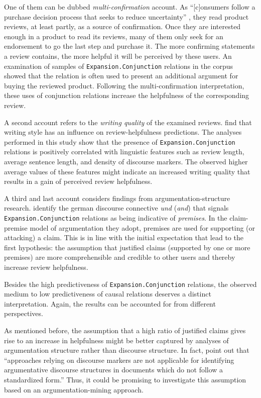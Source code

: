 \documentclass[
    a4paper,%
    12pt,%
    oneside,%
    toc=bibliography,
    final,
]{scrartcl}
\begin{document}
One of them can be dubbed \textit{multi-confirmation} account. As “[c]onsumers follow a purchase decision process that seeks to reduce uncertainty” \citep[187]{MudambiSchuff2010}, they read product reviews, at least partly, as a source of confirmation. Once they are interested enough in a product to read its reviews, many of them only seek for an endorsement to go the last step and purchase it. The more confirming statements a review contains, the more helpful it will be perceived by these users. An examination of samples of \lstinline|Expansion.Conjunction| relations in the corpus showed that the relation is often used to present an additional argument for buying the reviewed product. Following the multi-confirmation interpretation, these uses of conjunction relations increase the helpfulness of the corresponding review.

A second account refers to the \textit{writing quality} of the examined reviews. \citet{Liu2008} find that writing style has an influence on review-helpfulness predictions. The analyses performed in this study show that the presence of \lstinline|Expansion.Conjunction| relations is positively correlated with linguistic features such as review length, average sentence length, and density of discourse markers. The observed higher average values of these features might indicate an increased writing quality that results in a gain of perceived review helpfulness.

A third and last account considers findings from argumentation-structure research. \citet[2239]{Eckle-Kohler2015} identify the german discourse connective \textit{und} (\textit{and}) that signals \lstinline|Expansion.Conjunction| relations as being indicative of \textit{premises}. In the claim-premise model of argumentation they adopt, premises are used for supporting (or attacking) a claim. This is in line with the initial expectation that lead to the first hypothesis: the assumption that justified claims (supported by one or more premises) are more comprehensible and credible to other users and thereby increase review helpfulness.


Besides the high predictiveness of \lstinline|Expansion.Conjunction| relations, the observed medium to low predictiveness of causal relations deserves a distinct interpretation. Again, the results can be accounted for from different perspectives.

As mentioned before, the assumption that a high ratio of justified claims gives rise to an increase in helpfulness might be better captured by analyses of argumentation structure rather than discourse structure. In fact, \citet[54]{StabGurevych2014} point out that “approaches relying on discourse markers are not applicable for identifying argumentative discourse structures in documents which do not follow a standardized form.” Thus, it could be promising to investigate this assumption based on an argumentation-mining approach.
\end{document}
